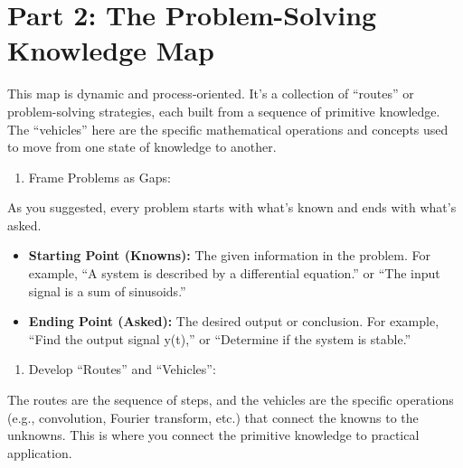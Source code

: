 \documentclass[
  letterpaper,
  DIV=11,
  numbers=noendperiod]{scrreprt}
\providecommand{\tightlist}{%
  \setlength{\itemsep}{0pt}\setlength{\parskip}{0pt}}\usepackage{longtable,booktabs,array}
\begin{document}
\section{Part 2: The Problem-Solving Knowledge
Map}\label{part-2-the-problem-solving-knowledge-map}

This map is dynamic and process-oriented. It's a collection of
``routes'' or problem-solving strategies, each built from a sequence of
primitive knowledge. The ``vehicles'' here are the specific mathematical
operations and concepts used to move from one state of knowledge to
another.

\begin{enumerate}
\def\labelenumi{\arabic{enumi}.}
\tightlist
\item
  Frame Problems as Gaps:
\end{enumerate}

As you suggested, every problem starts with what's known and ends with
what's asked.

\begin{itemize}
\item
  \textbf{Starting Point (Knowns):} The given information in the
  problem. For example, ``A system is described by a differential
  equation.'' or ``The input signal is a sum of sinusoids.''
\item
  \textbf{Ending Point (Asked):} The desired output or conclusion. For
  example, ``Find the output signal y(t),'' or ``Determine if the system
  is stable.''
\end{itemize}

\begin{enumerate}
\def\labelenumi{\arabic{enumi}.}
\setcounter{enumi}{1}
\tightlist
\item
  Develop ``Routes'' and ``Vehicles'':
\end{enumerate}

The routes are the sequence of steps, and the vehicles are the specific
operations (e.g., convolution, Fourier transform, etc.) that connect the
knowns to the unknowns. This is where you connect the primitive
knowledge to practical application.
\end{document}
